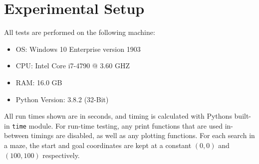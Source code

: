 \section{Experimental Setup}
\label{sec:Experimental Setup}
All tests are performed on the following machine:
\begin{itemize}
  \item OS: Windows 10 Enterprise version 1903
  \item CPU: Intel Core i7-4790 @ 3.60 GHZ
  \item RAM: 16.0 GB
  \item Python Version: 3.8.2 (32-Bit)
\end{itemize}
All run times shown are in seconds, and timing is calculated with Pythons built-in \texttt{time} module. For run-time testing, any print functions that are used in-between timings are disabled, as well as any plotting functions. For each search in a maze, the start and goal coordinates are kept at a constant $(0,0)$ and $(100,100)$ respectively.